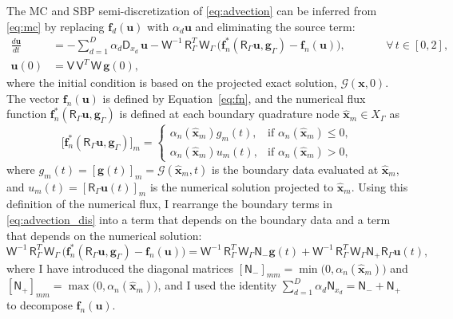 \documentclass[pdflatex,sn-mathphys-num]{sn-jnl}%
\theoremstyle{thmstyleone}%
\theoremstyle{thmstyletwo}%
\theoremstyle{thmstylethree}%
\newcommand{\mat}[1]{\ensuremath{\mathsf{#1}}}
\newcommand{\fnc}[1]{\ensuremath{\mathcal{#1}}}
\begin{document}
The MC and SBP semi-discretization of \eqref{eq:advection} can be inferred from \eqref{eq:mc} by replacing $\bm{f}_{d}(\bm{u})$ with $\alpha_{d} \bm{u}$ and eliminating the source term:
\begin{equation}\label{eq:advection_dis}
    \begin{alignedat}{2}
    \frac{d \bm{u}}{dt} &= -\sum_{d=1}^D \alpha_d \mat{D}_{x_d} \, \bm{u} - \mat{W}^{-1} \, \mat{R}_{\Gamma}^T \, \mat{W}_{\Gamma} \, \big( \bm{f}_n^*(\mat{R}_\Gamma \bm{u}, \bm{g}_\Gamma) - \bm{f}_n(\bm{u}) \big),&\qquad &\forall\, t \in [0,2], \\
    \bm{u}(0) &= \mat{V}\, \mat{V}^T \, \mat{W}\, \bm{g}(0),&&
    \end{alignedat}
\end{equation}
where the initial condition is based on the projected exact solution, $\fnc{G}(\bm{x},0)$.  The vector $\bm{f}_n(\bm{u})$ is defined by Equation~\eqref{eq:fn}, and the numerical flux function $\bm{f}_n^*(\mat{R}_\Gamma \bm{u}, \bm{g}_\Gamma)$ is defined at each boundary quadrature node $\hat{\bm{x}}_m \in X_{\Gamma}$ as
\begin{equation*}
    \big[ \bm{f}_n^*(\mat{R}_\Gamma \bm{u}, \bm{g}_\Gamma) \big]_m =
    \begin{cases} 
    \alpha_n(\hat{\bm{x}}_m) g_m(t), & \text{if } \alpha_n(\hat{\bm{x}}_m) \leq 0,\\
    \alpha_n(\hat{\bm{x}}_m) u_m(t), & \text{if } \alpha_n(\hat{\bm{x}}_m) > 0,
    \end{cases}
\end{equation*}
where $g_m(t) = [\bm{g}(t)]_m = \fnc{G}(\hat{\bm{x}}_m,t)$ is the boundary data evaluated at $\hat{\bm{x}}_m$, and $u_m(t) = [\mat{R}_\Gamma \bm{u}(t)]_m$ is the numerical solution projected to $\hat{\bm{x}}_m$.  Using this definition of the numerical flux, I rearrange the boundary terms in \eqref{eq:advection_dis} into a term that depends on the boundary data and a term that depends on the numerical solution:
\begin{equation}\label{eq:boundary_partition}
    \mat{W}^{-1} \, \mat{R}_{\Gamma}^T \, \mat{W}_{\Gamma} \, \big( \bm{f}_n^*(\mat{R}_\Gamma \bm{u}, \bm{g}_\Gamma) - \bm{f}_n(\bm{u}) \big)
    = \mat{W}^{-1} \, \mat{R}_{\Gamma}^T \, \mat{W}_{\Gamma} \mat{N}_{-} \bm{g}(t) + \mat{W}^{-1} \, \mat{R}_{\Gamma}^T \, \mat{W}_{\Gamma} \mat{N}_{+} \mat{R}_{\Gamma} \bm{u}(t),
\end{equation}
where I have introduced the diagonal matrices $[\mat{N}_{-}]_{mm} = \min\big(0,\alpha_n(\hat{\bm{x}}_m)\big)$ and $[\mat{N}_{+}]_{mm} = \max\big(0,\alpha_n(\hat{\bm{x}}_m)\big)$, and I used the identity $\sum_{d=1}^D \alpha_d \mat{N}_{x_d} = \mat{N}_{-} + \mat{N}_{+}$ to decompose $\bm{f}_n(\bm{u})$.
\end{document}

